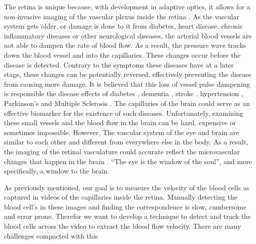 \documentclass[]{article}
\begin{document}
The retina is unique because, with development in adaptive optics, it allows for a non-invasive imaging of the vascular plexus inside the retina \cite{tam_noninvasive_2010}.
As the vascular system gets older, or damage is done to it from diabetes, heart disease, chronic inflammatory diseases or other neurological diseases, the arterial blood vessels are not able to dampen the rate of blood flow. As a result, the pressure wave tracks down the blood vessel and into the capillaries. 
These changes occur before the disease is detected. 
Contrary to the symptoms these diseases have at a later stage, these changes can be potentially reversed, effectively preventing the disease from causing more damage.  
It is believed that this loss of vessel pulse dampening is responsible the disease effects of diabetes \cite{mizutani_accelerated_diabetes_1996}, dementia \cite{de_la_torre_is_alzheimer_2004}, stroke \cite{ostergaard_role_stroke_2013}, hypertension \cite{wolf_s_quantification_hypertension_1994}, Parkinson's and Multiple Sclerosis \cite{bateman_comparison_multiple_sclerosis_2016}.
The capillaries of the brain could serve as an effective biomarker for the existence of such diseases.
Unfortunately, examining these small vessels and the blood flow in the brain can be hard, expensive or sometimes impossible.
However, The vascular system of the eye and brain are similar to each other and different from everywhere else in the body.
As a result, the imaging of the retinal vasculature could accurate reflect the microvascular changes that happen in the brain \cite{patton_retinal_brain_vasculature_similarity_2005}. ``The eye is the window of the soul'', and more specifically, a window to the brain.

As previously mentioned, our goal is to measure the velocity of the blood cells as captured in videos of the capillaries inside the retina.
Manually detecting the blood cell's in these images and finding the correspondence is slow, cumbersome and error prone.
Therefor we want to develop a technique to detect and track the blood cells across the video to extract the blood flow velocity.
There are many challenges compacted with this 


\printbibliography
\end{document}
